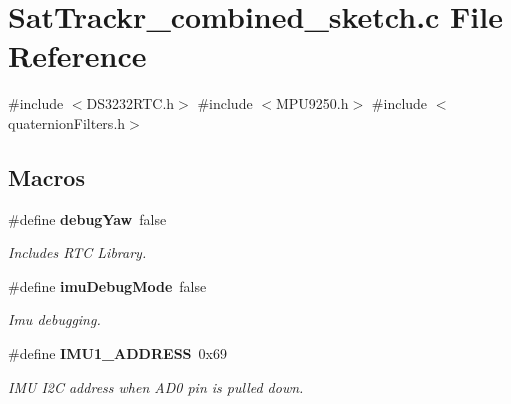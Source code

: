 \section{Sat\+Trackr\+\_\+combined\+\_\+sketch.\+c File Reference}
\label{_sat_trackr__combined__sketch_8c}
{\ttfamily \#include $<$D\+S3232\+R\+T\+C.\+h$>$}\newline
{\ttfamily \#include $<$M\+P\+U9250.\+h$>$}\newline
{\ttfamily \#include $<$quaternion\+Filters.\+h$>$}\newline
\subsection*{Macros}
\begin{DoxyCompactItemize}
\item 
\#define \textbf{ debug\+Yaw}~false
\begin{DoxyCompactList}\small\item\em Includes R\+TC Library. \end{DoxyCompactList}\item 
\#define \textbf{ imu\+Debug\+Mode}~false
\begin{DoxyCompactList}\small\item\em Imu debugging. \end{DoxyCompactList}\item 
\#define \textbf{ I\+M\+U1\+\_\+\+A\+D\+D\+R\+E\+SS}~0x69
\begin{DoxyCompactList}\small\item\em I\+MU I2C address when A\+D0 pin is pulled down. \end{DoxyCompactList}\end{DoxyCompactItemize}
